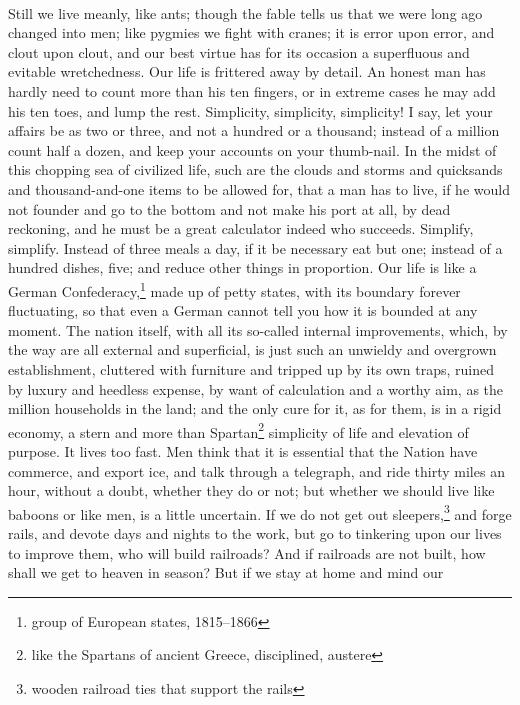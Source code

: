 \documentclass[letterpaper,12pt]{article}
\begin{document}
\paragraph{} Still we live meanly, like ants; though the fable tells us that we
were long ago changed into men; like pygmies we fight with cranes; it is error
upon error, and clout upon clout, and our best virtue has for its occasion
a superfluous and evitable wretchedness. Our life is frittered away by detail.
An honest man has hardly need to count more than his ten fingers, or in extreme
cases he may add his ten toes, and lump the rest. Simplicity, simplicity,
simplicity! I say, let your affairs be as two or three, and not a hundred or
a thousand; instead of a million count half a dozen, and keep your accounts on
your thumb-nail. In the midst of this chopping sea of civilized life, such are
the clouds and storms and quicksands and thousand-and-one items to be allowed
for, that a man has to live, if he would not founder and go to the bottom and
not make his port at all, by dead reckoning, and he must be a great calculator
indeed who succeeds. Simplify, simplify. Instead of three meals a day, if it be
necessary eat but one; instead of a hundred dishes, five; and reduce other
things in proportion. Our life is like a German Confederacy,\footnote{group of
    European states, 1815--1866} made up of petty states, with its boundary
forever fluctuating, so that even a German cannot tell you how it is bounded at
any moment. The nation itself, with all its so-called internal improvements,
which, by the way are all external and superficial, is just such an unwieldy and
overgrown establishment, cluttered with furniture and tripped up by its own
traps, ruined by luxury and heedless expense, by want of calculation and
a worthy aim, as the million households in the land; and the only cure for it,
as for them, is in a rigid economy, a stern and more than Spartan\footnote{like
    the Spartans of ancient Greece, disciplined, austere} simplicity of life and
elevation of purpose. It lives too fast. Men think that it is essential that the
Nation have commerce, and export ice, and talk through a telegraph, and ride
thirty miles an hour, without a doubt, whether they do or not; but whether we
should live like baboons or like men, is a little uncertain. If we do not get
out sleepers,\footnote{wooden railroad ties that support the rails} and forge
rails, and devote days and nights to the work, but go to tinkering upon our
lives to improve them, who will build railroads? And if railroads are not built,
how shall we get to heaven in season? But if we stay at home and mind our
\end{document}
